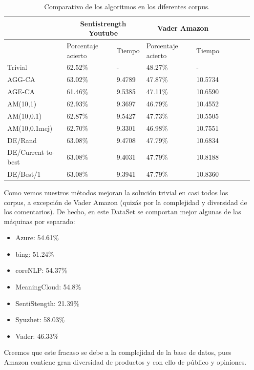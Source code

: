 \documentclass{article}
\begin{document}
\begin{table}[H]
	\begin{center}
		\resizebox{15cm}{!} {
			\begin{tabular}{|l|l|l|l|l|l|l|l|l|}
				\hline
				& \multicolumn{2}{|c|}{Sentistrength Youtube} & \multicolumn{2}{|c|}{Vader Amazon}\\ \hline
				& Porcentaje acierto &Tiempo & Porcentaje acierto & Tiempo\\ \hline
				Trivial&62.52\%& - & 48.27\%& -\\ \hline
				AGG-CA& 63.02\%& 9.4789 & 47.87\%& 10.5734\\ \hline
				AGE-CA& 61.46\%& 9.5385 & 47.11\%& 10.6590\\ \hline
				AM(10,1)& 62.93\%& 9.3697 & 46.79\% & 10.4552\\ \hline
				AM(10,0.1)& 62.87\%& 9.5427 & 47.73\% & 10.5505\\ \hline
				AM(10,0.1mej)& 62.70\%& 9.3301 & 46.98\% & 10.7551\\ \hline
				DE/Rand& 63.08\%& 9.4708 & 47.79\%& 10.6834\\ \hline
				DE/Current-to-best& 63.08\%&  9.4031 & 47.79\%& 10.8188\\ \hline
				DE/Best/1& 63.08\%& 9.3941 & 47.79\% & 10.8360 \\ \hline
			\end{tabular}
		}\caption{Comparativo de los algoritmos en los diferentes corpus.}
		\label{tabla:corpus2}
	\end{center}
\end{table}

Como vemos nuestros métodos mejoran la solución trivial en casi todos los corpus, a excepción de Vader Amazon (quizás por la complejidad y diversidad de los comentarios). De hecho, en este DataSet se comportan mejor algunas de las máquinas por separado:
\begin{itemize}
	\item Azure: 54.61\%
	\item bing: 51.24\%
	\item coreNLP: 54.37\%
	\item MeaningCloud: 54.8\%
	\item SentiStength: 21.39\%
	\item Syuzhet: 58.03\%
	\item Vader: 46.33\%
\end{itemize}
Creemos que este fracaso se debe a la complejidad de la base de datos, pues Amazon contiene gran diversidad de productos y con ello de público y opiniones.
\end{document}
